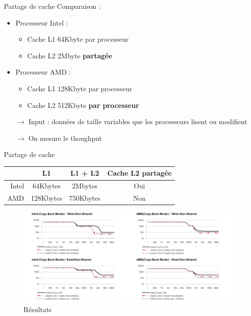 \documentclass{beamer}
\begin{document}
\begin{frame}{Partage de cache}
	Comparaison :\pause
	\begin{itemize}
		\item Processeur Intel :
			\begin{itemize}
				\item Cache L1 64Kbyte par processeur
				\item Cache L2 2Mbyte \textbf{partagée}
			\end{itemize}\pause
		\item Processeur AMD :
			\begin{itemize}
				\item Cache L1 128Kbyte par processeur
				\item Cache L2 512Kbyte \textbf{par processeur}
			\end{itemize}\pause
	\end{itemize}
	\begin{itemize}
		\item[$\rightarrow$] Input : données de taille variables que les processeurs
			lisent ou modifient
		\item[$\rightarrow$] On mesure le thoughput
	\end{itemize}
	\medskip
\end{frame}

\begin{frame}{Partage de cache}

	\begin{center}
		\begingroup
		\footnotesize
		\begin{tabular}{r|ccc}
		& L1 & L1 + L2 & Cache L2 partagée \\
		\hline
			Intel & 64Kbytes & 2Mbytes & Oui \\
			AMD & 128Kbytes & 750Kbytes & Non \\
		\end{tabular}
		\endgroup
	\end{center}

	\begin{figure}
		\centering
		\includegraphics[width=0.9\paperwidth]{results_cache_sharing.png}
		\caption{Résultats \cite{Fuch}}
		\label{fig:results_cache_sharing}
	\end{figure}	
\end{frame}
\end{document}
